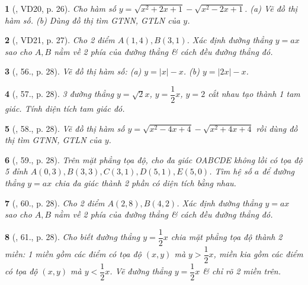 \documentclass{article}
\newtheorem{baitoan}{}
\begin{document}
\begin{baitoan}[\cite{Binh_Toan_9_tap_1}, VD20, p. 26]
	Cho hàm số $y = \sqrt{x^2 + 2x + 1} - \sqrt{x^2 - 2x + 1}$. (a) Vẽ đồ thị hàm số. (b) Dùng đồ thị tìm {\rm GTNN, GTLN} của $y$.
\end{baitoan}

\begin{baitoan}[\cite{Binh_Toan_9_tap_1}, VD21, p. 27]
	Cho 2 điểm $A(1,4),B(3,1)$. Xác định đường thẳng $y = ax$ sao cho $A,B$ nằm về 2 phía của đường thẳng \& cách đều đường thẳng đó.
\end{baitoan}

\begin{baitoan}[\cite{Binh_Toan_9_tap_1}, 56., p. 28]
	Vẽ đồ thị hàm số: (a) $y = |x| - x$. (b) $y = |2x| - x$.
\end{baitoan}

\begin{baitoan}[\cite{Binh_Toan_9_tap_1}, 57., p. 28]
	3 đường thẳng $y = \sqrt{2}x$, $y = \dfrac{1}{2}x$, $y = 2$ cắt nhau tạo thành 1 tam giác. Tính diện tích tam giác đó.
\end{baitoan}

\begin{baitoan}[\cite{Binh_Toan_9_tap_1}, 58., p. 28]
	Vẽ đồ thị hàm số $y = \sqrt{x^2 - 4x + 4} - \sqrt{x^2 + 4x + 4}$ rồi dùng đồ thị tìm {\rm GTNN, GTLN} của $y$.
\end{baitoan}

\begin{baitoan}[\cite{Binh_Toan_9_tap_1}, 59., p. 28]
	Trên mặt phẳng tọa độ, cho đa giác OABCDE không lồi có tọa độ 5 đỉnh $A(0,3),B(3,3),C(3,1),D(5,1),E(5,0)$. Tìm hệ số $a$ để đường thẳng $y = ax$ chia đa giác thành 2 phần có diện tích bằng nhau.
\end{baitoan}

\begin{baitoan}[\cite{Binh_Toan_9_tap_1}, 60., p. 28]
	Cho 2 điểm $A(2,8),B(4,2)$. Xác định đường thẳng $y = ax$ sao cho $A,B$ nằm về 2 phía của đường thẳng \& cách đều đường thẳng đó.
\end{baitoan}

\begin{baitoan}[\cite{Binh_Toan_9_tap_1}, 61., p. 28]
	Cho biết đường thẳng $y = \dfrac{1}{2}x$ chia mặt phẳng tọa độ thành 2 miền: 1 miền gồm các điểm có tọa độ $(x,y)$ mà $y > \dfrac{1}{2}x$, miền kia gồm các điểm có tọa độ $(x,y)$ mà $y < \dfrac{1}{2}x$. Vẽ đường thẳng $y = \dfrac{1}{2}x$ \& chỉ rõ 2 miền trên.
\end{baitoan}
\end{document}
